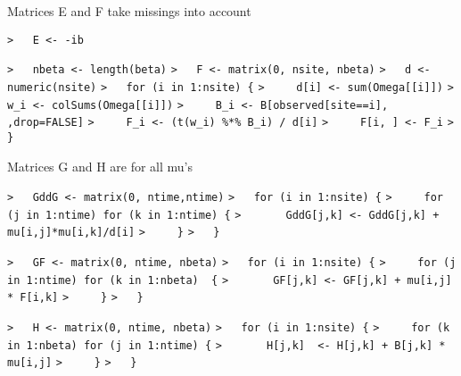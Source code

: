 \documentclass[a4paper]{article}
\begin{document}
Matrices E and F take missings into account\par
\verb~>   E <- -ib~\par

\verb~>   nbeta <- length(beta)~\newline
\verb~>   F <- matrix(0, nsite, nbeta)~\newline
\verb~>   d <- numeric(nsite)~\newline
\verb~>   for (i in 1:nsite) {~\newline
\verb~>     d[i] <- sum(Omega[[i]])~\newline
\verb~>     w_i <- colSums(Omega[[i]])~\newline
\verb~>     B_i <- B[observed[site==i], ,drop=FALSE]~\newline
\verb~>     F_i <- (t(w_i) %*% B_i) / d[i]~\newline
\verb~>     F[i, ] <- F_i~\newline
\verb~>   }~\par

Matrices G and H are for all mu's\par

\verb~>   GddG <- matrix(0, ntime,ntime)~\newline
\verb~>   for (i in 1:nsite) {~\newline
\verb~>     for (j in 1:ntime) for (k in 1:ntime) {~\newline
\verb~>       GddG[j,k] <- GddG[j,k] + mu[i,j]*mu[i,k]/d[i]~\newline
\verb~>     }~\newline
\verb~>   }~\par

\verb~>   GF <- matrix(0, ntime, nbeta)~\newline
\verb~>   for (i in 1:nsite) {~\newline
\verb~>     for (j in 1:ntime) for (k in 1:nbeta)  {~\newline
\verb~>       GF[j,k] <- GF[j,k] + mu[i,j] * F[i,k]~\newline
\verb~>     }~\newline
\verb~>   }~\par

\verb~>   H <- matrix(0, ntime, nbeta)~\newline
\verb~>   for (i in 1:nsite) {~\newline
\verb~>     for (k in 1:nbeta) for (j in 1:ntime) {~\newline
\verb~>       H[j,k]  <- H[j,k] + B[j,k] * mu[i,j]~\newline
\verb~>     }~\newline
\verb~>   }~\par
\end{document}
